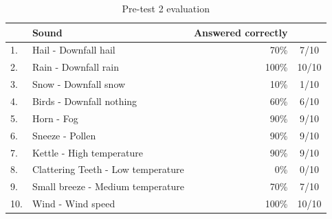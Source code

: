\begin{table}[!hb]
\centering
\begin{tabular}{l l r c}
   & Sound &  Answered correctly & \\
\hline
1. & Hail - Downfall hail & 70\% & 7/10 \\
2. & Rain - Downfall rain & 100\% & 10/10 \\
3. & Snow - Downfall snow & 10\% & 1/10 \\
4. & Birds - Downfall nothing & 60\% & 6/10 \\
5. & Horn - Fog & 90\% & 9/10 \\
6. & Sneeze - Pollen & 90\% & 9/10 \\
7. & Kettle - High temperature & 90\% & 9/10 \\
8. & Clattering Teeth - Low temperature & 0\% & 0/10 \\
9. & Small breeze - Medium temperature & 70\% & 7/10 \\
10. & Wind - Wind speed & 100\% & 10/10
\end{tabular}
\caption{Pre-test 2 evaluation}
\label{tab:pre_test_2_evaluation}
\end{table}

